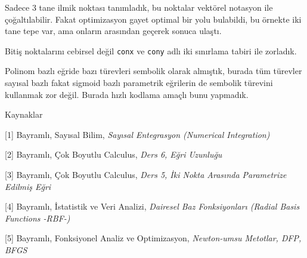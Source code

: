 \documentclass[12pt,fleqn]{article}\usepackage{../../common}
\begin{document}
Sadece 3 tane ilmik noktası tanımladık, bu noktalar vektörel notasyon ile
çoğaltılabilir. Fakat optimizasyon gayet optimal bir yolu bulabildi, bu
örnekte iki tane tepe var, ama onların arasından geçerek sonuca ulaştı. 

Bitiş noktalarını cebirsel değil \verb!conx! ve \verb!cony! adlı iki
sınırlama tabiri ile zorladık.

Polinom bazlı eğride bazı türevleri sembolik olarak almıştık, burada
tüm türevler sayısal bazlı fakat sigmoid bazlı parametrik eğrilerin de
sembolik türevini kullanmak zor değil. Burada hızlı kodlama amaçlı bunu
yapmadık. 

Kaynaklar 

[1] Bayramlı, Sayısal Bilim, {\em Sayısal Entegrasyon (Numerical Integration)}

[2] Bayramlı, Çok Boyutlu Calculus, {\em Ders 6, Eğri Uzunluğu}

[3] Bayramlı, Çok Boyutlu Calculus, {\em Ders 5, İki Nokta Arasında Parametrize Edilmiş Eğri}

[4] Bayramlı, İstatistik ve Veri Analizi, {\em Dairesel Baz Fonksiyonları (Radial Basis Functions -RBF-)}

[5] Bayramlı, Fonksiyonel Analiz ve Optimizasyon, {\em Newton-umsu Metotlar, DFP, BFGS }
\end{document}
